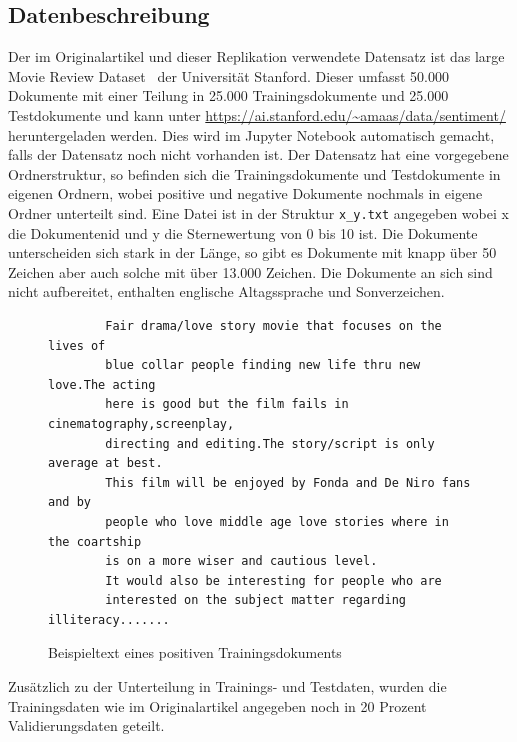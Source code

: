 \documentclass[DIV=13,fontsize=11pt]{scrartcl}
\begin{document}
\subsection{Datenbeschreibung}
Der im Originalartikel und dieser Replikation verwendete Datensatz ist das large Movie
Review Dataset~\cite{maas-EtAl:2011:ACL-HLT2011} der Universität Stanford.
Dieser umfasst 50.000 Dokumente mit einer Teilung in 25.000 Trainingsdokumente und 25.000 Testdokumente und kann unter
\url{https://ai.stanford.edu/~amaas/data/sentiment/} heruntergeladen werden. Dies wird im Jupyter Notebook automatisch gemacht, falls
der Datensatz noch nicht vorhanden ist.
Der Datensatz hat eine vorgegebene Ordnerstruktur, so befinden sich die Trainingsdokumente und Testdokumente in eigenen Ordnern,
wobei positive und negative Dokumente nochmals in eigene Ordner unterteilt sind. Eine Datei ist in der Struktur \texttt{x\_y.txt}
angegeben wobei x die Dokumentenid und y die Sternewertung von 0 bis 10 ist.
Die Dokumente unterscheiden sich stark in der Länge, so gibt es Dokumente mit knapp über 50 Zeichen aber auch solche mit über 13.000 Zeichen.
Die Dokumente an sich sind nicht aufbereitet, enthalten englische Altagssprache und Sonverzeichen.

\begin{figure}[H]
    \centering
    \begin{lstlisting}
        Fair drama/love story movie that focuses on the lives of 
        blue collar people finding new life thru new love.The acting 
        here is good but the film fails in cinematography,screenplay,
        directing and editing.The story/script is only average at best.
        This film will be enjoyed by Fonda and De Niro fans and by 
        people who love middle age love stories where in the coartship 
        is on a more wiser and cautious level.
        It would also be interesting for people who are 
        interested on the subject matter regarding illiteracy.......
    \end{lstlisting}
    \caption{Beispieltext eines positiven Trainingsdokuments}
\end{figure}

Zusätzlich zu der Unterteilung in Trainings- und Testdaten, wurden die Trainingsdaten wie im Originalartikel angegeben
noch in 20 Prozent Validierungsdaten geteilt.
\end{document}

